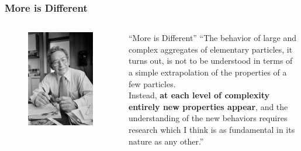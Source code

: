 \documentclass[10pt,aspectratio=43,xcolor=x11names,t]{beamer}%
\begin{document}
		\begin{frame}\frametitle{More is Different}
			\begin{columns}
				\begin{column}{0.45\textwidth}
					\begin{figure}[!htp]
						\centering
						\includegraphics[scale=0.3]{Anderson.jpg}
					\end{figure}
				\end{column}
				\begin{column}{0.5\textwidth}
					\begin{block}{``More is Different''}
						``The behavior of large and complex aggregates of elementary particles, it turns out, is not to be understood in terms of a simple extrapolation of the properties of a few particles.\\Instead, \textbf{\color{red}at each level of complexity entirely new properties appear}, and the understanding of the new behaviors requires research which I think is as fundamental in its nature as any other.''
					\end{block}
				\end{column}				
			\end{columns}
		\end{frame}		
\end{document}
